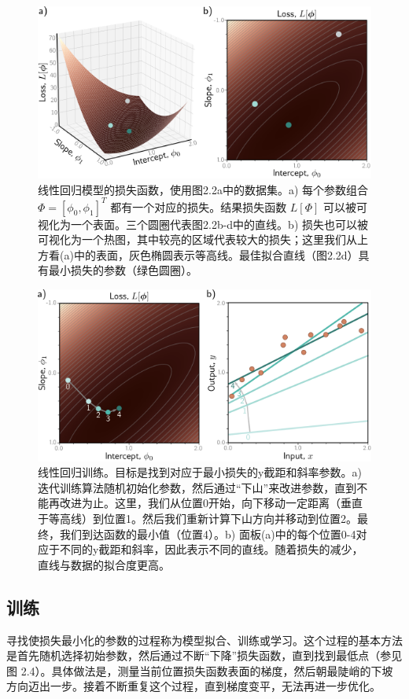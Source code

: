 \begin{figure}
	\centering
	\includegraphics[width=0.7\linewidth]{png/chapter2/SupervisedSurface}
	\caption{线性回归模型的损失函数，使用图2.2a中的数据集。a) 每个参数组合 $\Phi = [\phi_0, \phi_1]^T$ 都有一个对应的损失。结果损失函数 $L[\Phi]$ 可以被可视化为一个表面。三个圆圈代表图2.2b-d中的直线。b) 损失也可以被可视化为一个热图，其中较亮的区域代表较大的损失；这里我们从上方看(a)中的表面，灰色椭圆表示等高线。最佳拟合直线（图2.2d）具有最小损失的参数（绿色圆圈）。}
\end{figure}

\begin{figure}
	\centering
	\includegraphics[width=0.7\linewidth]{png/chapter2/SupervisedOpt}
	\caption{线性回归训练。目标是找到对应于最小损失的y截距和斜率参数。a) 迭代训练算法随机初始化参数，然后通过“下山”来改进参数，直到不能再改进为止。这里，我们从位置0开始，向下移动一定距离（垂直于等高线）到位置1。然后我们重新计算下山方向并移动到位置2。最终，我们到达函数的最小值（位置4）。b) 面板(a)中的每个位置0-4对应于不同的y截距和斜率，因此表示不同的直线。随着损失的减少，直线与数据的拟合度更高。}
\end{figure}

\subsection{训练}

寻找使损失最小化的参数的过程称为模型拟合、训练或学习。这个过程的基本方法是首先随机选择初始参数，然后通过不断“下降”损失函数，直到找到最低点（参见图 2.4）。具体做法是，测量当前位置损失函数表面的梯度，然后朝最陡峭的下坡方向迈出一步。接着不断重复这个过程，直到梯度变平，无法再进一步优化。

